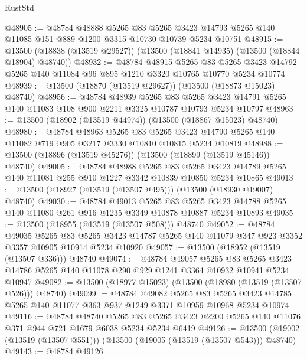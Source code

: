 \begin{lexlean}{RustStd}
\begin{coremodule}
@48905 := @48784
    @48888
    @5265
    @83
    @5265
    @3423
    @14793
    @5265
    @140
    @11085
    @151
    @889
    @1200
    @3315
    @10730
    @10739
    @5234
    @10751
@48915 := @13500 (@18838 (@13519 @29527)) (@13500 (@18841 @14935) (@13500 (@18844 @18904) @48740))
@48932 := @48784
    @48915
    @5265
    @83
    @5265
    @3423
    @14792
    @5265
    @140
    @11084
    @96
    @895
    @1210
    @3320
    @10765
    @10770
    @5234
    @10774
@48939 := @13500 (@18870 (@13519 @29627)) (@13500 (@18873 @15023) @48740)
@48956 := @48784
    @48939
    @5265
    @83
    @5265
    @3423
    @14791
    @5265
    @140
    @11083
    @108
    @900
    @2211
    @3325
    @10787
    @10793
    @5234
    @10797
@48963 := @13500 (@18902 (@13519 @44974)) (@13500 (@18867 @15023) @48740)
@48980 := @48784
    @48963
    @5265
    @83
    @5265
    @3423
    @14790
    @5265
    @140
    @11082
    @719
    @905
    @3217
    @3330
    @10810
    @10815
    @5234
    @10819
@48988 := @13500 (@18896 (@13519 @45276)) (@13500 (@18899 (@13519 @45146)) @48740)
@49005 := @48784
    @48988
    @5265
    @83
    @5265
    @3423
    @14789
    @5265
    @140
    @11081
    @255
    @910
    @1227
    @3342
    @10839
    @10850
    @5234
    @10865
@49013 := @13500 (@18927 (@13519 (@13507 @495))) (@13500 (@18930 @19007) @48740)
@49030 := @48784
    @49013
    @5265
    @83
    @5265
    @3423
    @14788
    @5265
    @140
    @11080
    @261
    @916
    @1235
    @3349
    @10878
    @10887
    @5234
    @10893
@49035 := @13500 (@18955 (@13519 (@13507 @508))) @48740
@49052 := @48784
    @49035
    @5265
    @83
    @5265
    @3423
    @14787
    @5265
    @140
    @11079
    @347
    @923
    @3352
    @3357
    @10905
    @10914
    @5234
    @10920
@49057 := @13500 (@18952 (@13519 (@13507 @336))) @48740
@49074 := @48784
    @49057
    @5265
    @83
    @5265
    @3423
    @14786
    @5265
    @140
    @11078
    @290
    @929
    @1241
    @3364
    @10932
    @10941
    @5234
    @10947
@49082 := @13500 (@18977 @15023) (@13500 (@18980 (@13519 (@13507 @526))) @48740)
@49099 := @48784
    @49082
    @5265
    @83
    @5265
    @3423
    @14785
    @5265
    @140
    @11077
    @363
    @937
    @1249
    @3371
    @10959
    @10968
    @5234
    @10974
@49116 := @48784
    @48740
    @5265
    @83
    @5265
    @3423
    @2200
    @5265
    @140
    @11076
    @371
    @944
    @721
    @1679
    @6038
    @5234
    @5234
    @6419
@49126 := @13500 (@19002 (@13519 (@13507 @551))) (@13500 (@19005 (@13519 (@13507 @543))) @48740)
@49143 := @48784
    @49126

\end{coremodule}
\end{lexlean}
